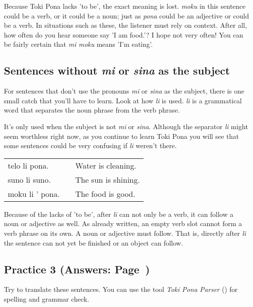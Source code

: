 Because Toki Pona lacks 'to be', the exact meaning is lost. 
\textit{moku} in this sentence could be a verb, or it could be a noun; just as \textit{pona} could be an adjective or could be a verb. 
In situations such as these, the listener must rely on context. 
After all, how often do you hear someone say 'I am food.'? 
I hope not very often! You can be fairly certain that \textit{mi moku} means 'I'm eating'. 
%
\subsection*{Sentences without \textit{mi} or \textit{sina} as the subject}
%
For sentences that don't use the pronouns \textit{mi} or \textit{sina} as the subject, there is one small catch that you'll have to learn. 
Look at how \textit{li} is used. 
\textit{\textit{li}} is a grammatical word that separates the noun phrase from the verb phrase. 


It's only used when the subject is not \textit{mi} or \textit{sina}. 
Although the separator \textit{li} might seem worthless right now, as you continue to learn Toki Pona you will see that some sentences could be very confusing if \textit{li} weren't there. 

\begin{supertabular}{p{5cm}|ll}
telo li pona. && Water is cleaning. \\
suno li suno. && The sun is shining. \\
moku li ' pona. && The food is good. \\ 
\end{supertabular} 

Because of the lacks of 'to be', after \textit{li} can not only be a verb, it can follow a noun or adjective as well. 
As already written, an empty verb slot cannot form a verb phrase on its own. 
A noun or adjective must follow. 
That is, directly after \textit{li} the sentence can not yet be finished or an object can follow.
%
\newpage
\subsection*{Practice 3 (Answers: Page~\pageref{'basic_sentences'})}
%
Try to translate these sentences. 
You can use the tool \textit{Toki Pona Parser} (\cite{www:rowa:02}) for spelling and grammar check. 

